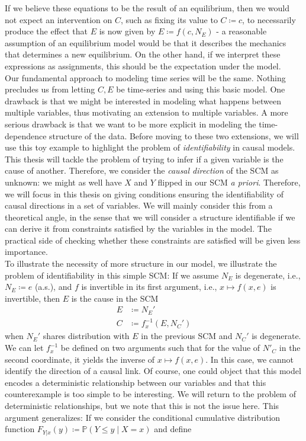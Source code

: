\documentclass[11pt, a4paper]{memoir}
\theoremstyle{break}
\theoremstyle{break}
\theoremstyle{nonumberplain}
\newcommand{\mP}{\mathbb{P}}
\begin{document}
If we believe these equations to be the result of an equilibrium, then we would not expect an intervention on $C$, such as fixing its value to $C\coloneqq c$, to necessarily produce the effect that $E$ is now given by $E\coloneqq f(c,N_E)$ - a reasonable assumption of an equilibrium model would be that it describes the mechanics that determines a new equilibrium. On the other hand, if we interpret these expressions as assignments, this should be the expectation under the model.\\[5pt]
Our fundamental approach to modeling time series will be the same. Nothing precludes us from letting $C,E$ be time-series and using this basic model. One drawback is that we might be interested in modeling what happens between multiple variables, thus motivating an extension to multiple variables. A more serious drawback is that we want to be more explicit in modeling the time-dependence structure of the data. Before moving to these two extensions, we will use this toy example to highlight the problem of \emph{identifiability} in causal models. This thesis will tackle the problem of trying to infer if a given variable is the cause of another. Therefore, we consider the \emph{causal direction} of the SCM as unknown: we might as well have $X$ and $Y$ flipped in our SCM \emph{a priori}. Therefore, we will focus in this thesis on giving conditions ensuring the identifiability of causal directions in a set of variables. We will mainly consider this from a theoretical angle, in the sense that we will consider a structure identifiable if we can derive it from constraints satisfied by the variables in the model. The practical side of checking whether these constraints are satisfied will be given less importance.\\[5pt]
To illustrate the necessity of more structure in our model, we illustrate the problem of identifiability in this simple SCM: If we assume $N_E$ is degenerate, i.e., $N_E\coloneqq e$ (a.s.), and $f$ is invertible in its first argument, i.e., $x\mapsto f(x,e)$ is invertible, then $E$ is the cause in the SCM
\begin{align*}
E&\coloneqq N_E'\\
C&\coloneqq f_x^{-1}(E,N_C')
\end{align*}
when $N_E'$ shares distribution with $E$ in the previous SCM and $N_C'$ is degenerate.  We can let $f_x^{-1}$ be defined on two arguments such that for the value of $N'_C$ in the second coordinate, it yields the inverse of $x\mapsto f(x,e)$. In this case, we cannot identify the direction of a causal link. Of course, one could object that this model encodes a deterministic relationship between our variables and that this counterexample is too simple to be interesting. We will return to the problem of deterministic relationships, but we note that this is not the issue here. This argument generalizes: If we consider the conditional cumulative distribution function $F_{Y|x}(y)\coloneqq \mP(Y\leqslant y\mid X=x)$ and define
\end{document}
